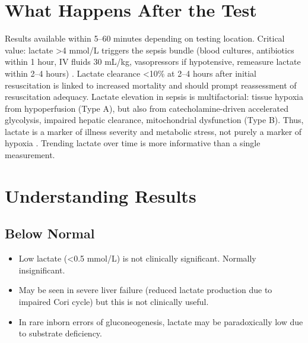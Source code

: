 \section*{What Happens After the Test}
Results available within 5--60 minutes depending on testing location. Critical value: lactate >4 mmol/L triggers the sepsis bundle (blood cultures, antibiotics within 1 hour, IV fluids 30 mL/kg, vasopressors if hypotensive, remeasure lactate within 2--4 hours) \cite{tierney2023current}. Lactate clearance <10\% at 2--4 hours after initial resuscitation is linked to increased mortality and should prompt reassessment of resuscitation adequacy. Lactate elevation in sepsis is multifactorial: tissue hypoxia from hypoperfusion (Type A), but also from catecholamine-driven accelerated glycolysis, impaired hepatic clearance, mitochondrial dysfunction (Type B). Thus, lactate is a marker of illness severity and metabolic stress, not purely a marker of hypoxia \cite{suetrong2016lactic}. Trending lactate over time is more informative than a single measurement.

\section*{Understanding Results}

\subsection*{Below Normal}
\begin{itemize}
  \item Low lactate (<0.5 mmol/L) is not clinically significant. Normally insignificant.
  \item May be seen in severe liver failure (reduced lactate production due to impaired Cori cycle) but this is not clinically useful.
  \item In rare inborn errors of gluconeogenesis, lactate may be paradoxically low due to substrate deficiency.
\end{itemize}

